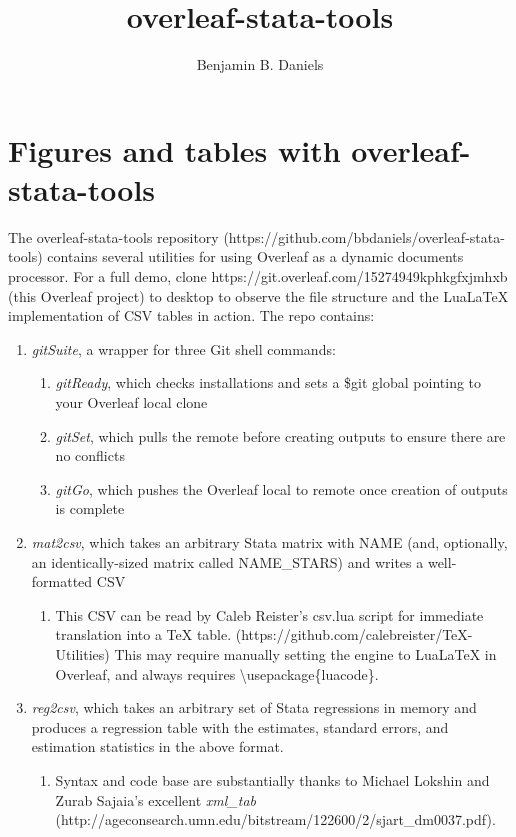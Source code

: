 \documentclass[a4paper]{article}
\title{overleaf-stata-tools}
\author{Benjamin B. Daniels}
\begin{document}
\maketitle

\section{Figures and tables with overleaf-stata-tools}

The overleaf-stata-tools repository (https://github.com/bbdaniels/overleaf-stata-tools) contains several utilities for using Overleaf as a dynamic documents processor. For a full demo, clone https://git.overleaf.com/15274949kphkgfxjmhxb (this Overleaf project) to desktop to observe the file structure and the LuaLaTeX implementation of CSV tables in action. The repo contains:

\begin{enumerate}
\item {\it gitSuite}, a wrapper for three Git shell commands:
	\begin{enumerate}
	\item {\it gitReady}, which checks installations and sets a \${git} global pointing to your Overleaf local clone
    \item {\it gitSet}, which pulls the remote before creating outputs to ensure there are no conflicts
    \item {\it gitGo}, which pushes the Overleaf local to remote once creation of outputs is complete
    \end{enumerate}
\item {\it mat2csv}, which takes an arbitrary Stata matrix with NAME (and, optionally, an identically-sized matrix called NAME\_STARS) and writes a well-formatted CSV
	\begin{enumerate}
	\item This CSV can be read by Caleb Reister's csv.lua script for immediate translation into a TeX table. (https://github.com/calebreister/TeX-Utilities) This may require manually setting the engine to LuaLaTeX in Overleaf, and always requires \textbackslash usepackage\{luacode\}.
    \end{enumerate}
\item {\it reg2csv}, which takes an arbitrary set of Stata regressions in memory and produces a regression table with the estimates, standard errors, and estimation statistics in the above format.
	\begin{enumerate}
	\item Syntax and code base are substantially thanks to Michael Lokshin and Zurab Sajaia's excellent {\it xml\_tab} (http://ageconsearch.umn.edu/bitstream/122600/2/sjart\_dm0037.pdf).
    \end{enumerate}

\end{enumerate}
\end{document}
